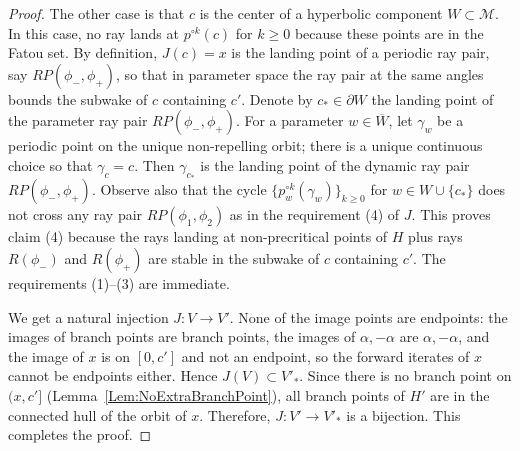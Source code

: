 \documentclass[12pt]{amsart}
\newcommand{\M}{\mathscr M}
\newcommand{\0}{\texttt{0}}
\newcommand{\1}{\texttt{1}}
\theoremstyle{definition}
\numberwithin{equation}{section}
\newcommand{\ovl}[1]{\overline{#1}}
\begin{document}
\begin{proof}
The other case is that $c$ is the center of a hyperbolic component $W\subset\M$. In this case, no ray lands at $p^{\circ k}(c)$ for $k\ge 0$ because these points are in the Fatou set. By definition, $J(c)=x$ is the landing point of a periodic ray pair, say $RP(\phi_-,\phi_+)$, so that in parameter space the ray pair at the same angles bounds the subwake of $c$ containing $c'$. Denote by $c_*\in \partial W$ the landing point of the parameter ray pair $RP(\phi_-,\phi_+)$. For a parameter $w\in \ovl W$, let $\gamma_w$ be a periodic point on the unique non-repelling orbit; there is a unique continuous choice so that $\gamma_c=c$.  Then  $\gamma_{c_*}$ is the landing point of the dynamic ray pair $RP(\phi_-,\phi_+)$. Observe also that the cycle $\{p_w^{\circ k}(\gamma_w)\}_{k\ge 0}$ for $w\in W\cup\{c_*\}$ does not cross any ray pair $RP(\phi_1,\phi_2)$ as in the requirement (4) of $J$. This proves claim (4) because the rays landing at non-precritical points of $H$ plus rays $R(\phi_-)$ and $R(\phi_+)$ are stable in the subwake of $c$ containing $c'$. The requirements (1)--(3) are immediate.





We get a natural injection $J\colon V\to V'$. None of the image points are endpoints: the images of branch points are branch points, the images of $\alpha, -\alpha$ are $\alpha, -\alpha$, and the image of $x$ is on $[0,c']$ and not an endpoint, so the forward iterates of $x$ cannot be endpoints either. Hence $J(V)\subset V'_*$. Since there is no branch point on $(x,c']$ (Lemma~\ref{Lem:NoExtraBranchPoint}), all branch points of $H'$ are in the connected hull of the orbit of $x$. Therefore, $J:V'\to V'_*$ is a bijection. This completes the proof.
\end{proof}


\end{document}
